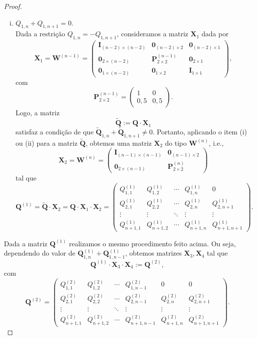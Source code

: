 \documentclass[twoside,openright,titlepage,numbers=noenddot,headinclude,  lineheaders footinclude=true,cleardoublepage=empty,
                                BCOR=5mm,paper=a4,fontsize=12pt ]{scrbook}
\theoremstyle{definition}
\begin{document}
\begin{proof}
\begin{enumerate}[(i)]
\item  $Q_{1,n} + Q_{1, n+1} = 0$. \hfill \\
Dada a restrição $Q_{1,n} = -Q_{1, n+1} $, consideramos a matriz
$\mathbf{X}_1$ dada por
\[
\mathbf{X}_1 = \mathbf{W}^{(n-1)}=
\begin{pmatrix}
\mathbf{I}_{(n-2)\times (n-2)}& \mathbf{0}_{(n-2) \times 2} &
\mathbf{0}_{(n-2) \times 1} \\
\mathbf{0}_{2 \times (n-2)} & \mathbf{P}^{(n-1)}_{2 \times 2} &
 \mathbf{0}_{2 \times 1}\\
\mathbf{0}_{1 \times (n-2)} & \mathbf{0}_{1 \times 2}
 & \mathbf{I}_{1\times 1}
\end{pmatrix}
,
\]
com
\[
\mathbf{P}^{(n-1)}_{2 \times 2}=
\begin{pmatrix}
1 & 0\\
0,5 & 0,5
\end{pmatrix}
.
\]
Logo, a matriz
\[
\mathbf{\widetilde{Q}} := \mathbf{Q} \cdot \mathbf{X}_1
\]
satisfaz a condição de que 
$\mathbf{\widetilde{Q}}_{1,n} + \mathbf{\widetilde{Q}}_{1,n+1}
\neq 0$. Portanto, aplicando o item (i) ou (ii) para 
a matriz $\mathbf{\widetilde{Q}}$, obtemos uma matriz
$\mathbf{X}_2$ do tipo $\mathbf{W}^{(n)}$, i.e.,
\[
\mathbf{X}_2= \mathbf{W}^{(n)} =
\begin{pmatrix}
\mathbf{I}_{(n-1)\times (n-1)}& \mathbf{0}_{(n-1) \times 2} \\
\mathbf{0}_{2 \times (n-1)}   & \mathbf{P}^{(n)}_{2 \times 2}   
\end{pmatrix}
\]
tal que
\[
\mathbf{Q}^{(1)} = \mathbf{\widetilde{Q}} \cdot \mathbf{X}_2 =
\mathbf{Q} \cdot \mathbf{X}_1 \cdot \mathbf{X}_2 =
\begin{pmatrix}
Q^{(1)}_{1,1} & Q^{(1)}_{1,2} & \cdots & Q^{(1)}_{1,n} &0\\
Q^{(1)}_{2,1} & Q^{(1)}_{2,2} & \cdots & Q^{(1)}_{2,n}&
Q^{(1)}_{2,n+1}\\
\vdots & \vdots & \ddots & \vdots & \vdots \\
Q^{(1)}_{n+1,1} & Q^{(1)}_{n+1,2} & \cdots & Q^{(1)}_{n+1,n} &
Q^{(1)}_{n+1,n+1}
\end{pmatrix}
.
\]

\end{enumerate}

Dada a matriz $\mathbf{Q}^{(1)}$
realizamos o mesmo procedimento feito acima. Ou seja, dependendo
do valor de $\mathbf{Q}^{(1)}_{1,n} + \mathbf{Q}^{(1)}_{1,n-1}$,
obtemos matrizes $\mathbf{X}_{3}, \mathbf{X}_{4}$ tal que
\[
\mathbf{Q}^{(1)} \cdot \mathbf{X}_3 \cdot
\mathbf{X}_4 :=
\mathbf{Q}^{(2)},
\]
com 
\[
\mathbf{Q}^{(2)} = 
\begin{pmatrix}
Q^{(2)}_{1,1} & Q^{(2)}_{1,2} & \cdots & Q^{(2)}_{1,n-1} & 0&0\\
Q^{(2)}_{2,1} & Q^{(2)}_{2,2} & \cdots & Q^{(2)}_{2,n-1}&
 Q^{(2)}_{2,n}&
Q^{(2)}_{2,n+1}\\
\vdots & \vdots & \ddots & \vdots & \vdots & \vdots \\
Q^{(2)}_{n+1,1} & Q^{(2)}_{n+1,2} & \cdots & Q^{(2)}_{n+1,n-1}&
 Q^{(2)}_{n+1,n} &
Q^{(2)}_{n+1,n+1}
\end{pmatrix}
.
\]


\end{proof}
\end{document}

